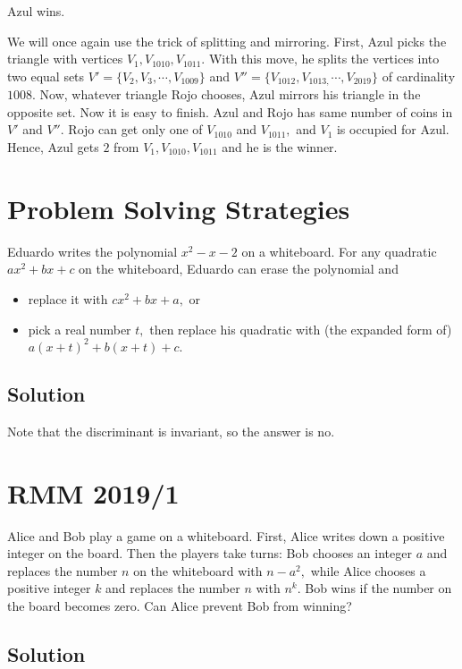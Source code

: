 \documentclass[mast]{lucky}
\begin{document}
Azul wins.

We will once again use the trick of splitting and mirroring. First, Azul picks the triangle with vertices $V_1, V_{1010}, V_{1011}.$ With this move, he splits the vertices into two equal sets $V' = \{V_2, V_3, \cdots, V_{1009} \}$ and $V'' =\{V_{1012}, V_{1013,} \cdots, V_{2019}\} $ of cardinality $1008.$ Now, whatever triangle Rojo chooses, Azul mirrors his triangle in the opposite set. Now it is easy to finish. Azul and Rojo has same number of coins in $V'$ and $V''.$ Rojo can get only one of $V_{1010}$ and $V_{1011},$ and $V_1$ is occupied for Azul. Hence, Azul gets $2$ from $V_1, V_{1010}, V_{1011}$ and he is the winner.

\pagebreak\section{Problem Solving Strategies}

Eduardo writes the polynomial $x^2-x-2$ on a whiteboard. For any quadratic $ax^2+bx+c$ on the whiteboard, Eduardo can erase the polynomial and
\begin{itemize}
        \item replace it with $cx^2 + bx + a,$ or
        
        \item pick a real number $t,$ then replace his quadratic with (the expanded form of)
$a(x + t)^2 + b(x + t) + c.$
\end{itemize}

\subsection{Solution}

Note that the discriminant is invariant, so the answer is no.

\pagebreak\section{RMM 2019/1}

Alice and Bob play a game on a whiteboard. First, Alice writes down a positive integer on the board. Then the players take turns: Bob chooses an integer $a$ and replaces the number $n$ on the whiteboard with $n-a^2,$ while Alice chooses a positive integer $k$ and replaces the number $n$ with $n^k.$ Bob wins if the number on the board becomes zero. Can Alice prevent Bob from winning?

\subsection{Solution}
 
\end{document}
